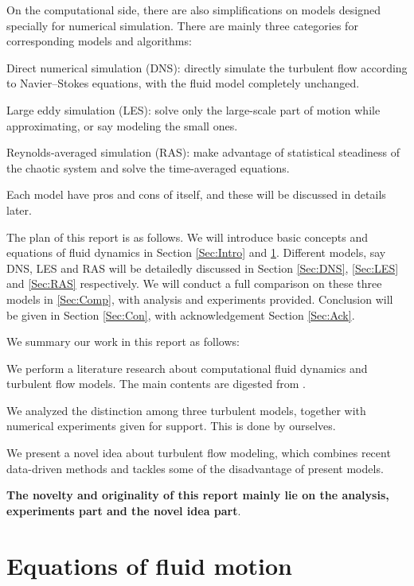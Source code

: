 \documentclass[english, nochinese]{pkupaper}
\begin{document}
On the computational side, there are also simplifications on models designed specially for numerical simulation. There are mainly three categories for corresponding models and algorithms:
\begin{partlist}
\item Direct numerical simulation (DNS): directly simulate the turbulent flow according to Navier--Stokes equations, with the fluid model completely unchanged.
\item Large eddy simulation (LES): solve only the large-scale part of motion while approximating, or say modeling the small ones.
\item Reynolds-averaged simulation (RAS): make advantage of statistical steadiness of the chaotic system and solve the time-averaged equations.
\end{partlist}
Each model have pros and cons of itself, and these will be discussed in details later.

The plan of this report is as follows. We will introduce basic concepts and equations of fluid dynamics in Section \ref{Sec:Intro} and \ref{Sec:Eq}. Different models, say DNS, LES and RAS will be detailedly discussed in Section \ref{Sec:DNS}, \ref{Sec:LES} and \ref{Sec:RAS} respectively. We will conduct a full comparison on these three models in \ref{Sec:Comp}, with analysis and experiments provided. Conclusion will be given in Section \ref{Sec:Con}, with acknowledgement Section \ref{Sec:Ack}.

We summary our work in this report as follows:
\begin{partlist}
\item We perform a literature research about computational fluid dynamics and turbulent flow models. The main contents are digested from \parencite{pope_turbulent_2001} \parencite{zhaoshun_zhang_theory_2005}.
\item We analyzed the distinction among three turbulent models, together with numerical experiments given for support. This is done by ourselves.
\item We present a novel idea about turbulent flow modeling, which combines recent data-driven methods and tackles some of the disadvantage of present models.
\end{partlist}
\textbf{The novelty and originality of this report mainly lie on the analysis, experiments part and the novel idea part}.

\section{Equations of fluid motion} \label{Sec:Eq}
\end{document}

